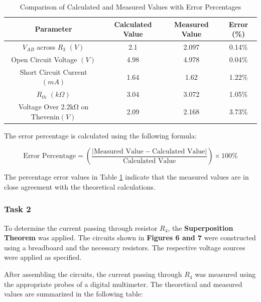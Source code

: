 \documentclass{article}
\begin{document}
\newpage



\begin{table}[h!]
  \centering
  \begin{tabular}{|c|c|c|c|}
  \hline
  \textbf{Parameter}         & \textbf{Calculated Value} & \textbf{Measured Value} & \textbf{Error (\%)} \\
  \hline
  \( V_{AB} \) across \( R_3 \) \((V)\)       & 2.1      & 2.097     & 0.14\% \\   \hline
  Open Circuit Voltage          \((V)\)       & 4.98     & 4.978     & 0.04\% \\   \hline
  Short Circuit Current         \((mA)\)      & 1.64     & 1.62      & 1.22\% \\   \hline
  \( R_{th} \)                  \((k\Omega)\) & 3.04     & 3.072     & 1.05\% \\   \hline
  Voltage Over 2.2kΩ on Thevenin\((V)\)       & 2.09     & 2.168     & 3.73\% \\   \hline
  \end{tabular}
  \caption{Comparison of Calculated and Measured Values with Error Percentages}
  \label{tab:comparison}
\end{table}

\noindent The error percentage is calculated using the following formula:

\[
\text{Error Percentage} = \left( \frac{|\text{Measured Value} - \text{Calculated Value}|}{\text{Calculated Value}} \right) \times 100\%
\]

\noindent
The percentage error values in Table \ref{tab:comparison} indicate that the measured values are in close agreement with the theoretical calculations.




\subsubsection{Task 2}

\noindent 
To determine the current passing through resistor \( R_4 \), the \textbf{Superposition Theorem} was applied. The circuits shown in \textbf{Figures 6 and 7} were constructed using a breadboard and the necessary resistors. The respective voltage sources were applied as specified. 


\noindent After assembling the circuits, the current passing through \( R_4 \) was measured using the appropriate probes of a digital multimeter. The theoretical and measured values are summarized in the following table:
\end{document}
